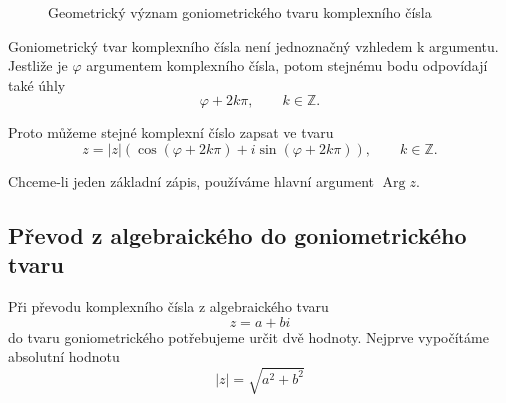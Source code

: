 \documentclass[12pt,a4paper]{article}
\begin{document}
\begin{figure}[ht]
    \begin{center}

        \caption{Geometrický význam goniometrického tvaru komplexního čísla}
    \end{center}
\end{figure}


\begin{notebox}
    Goniometrický tvar komplexního čísla není jednoznačný vzhledem k argumentu.
    Jestliže je $\varphi$ argumentem komplexního čísla, 
    potom stejnému bodu odpovídají také úhly
    \[
        \varphi+2k \pi , \qquad k \in \mathbb{Z}.
    \]

    Proto můžeme stejné komplexní číslo zapsat ve tvaru
    \[
        z = |z| \left( \cos(\varphi+2k\pi) + i\sin(\varphi+2k\pi) \right),
        \qquad k \in \mathbb{Z}.
    \]

    Chceme-li jeden základní zápis, používáme hlavní argument $\operatorname{Arg}z$.
\end{notebox}


\subsection{Převod z algebraického do goniometrického tvaru}
Při převodu komplexního čísla z algebraického tvaru
\[
    z=a+bi
\]
do tvaru goniometrického potřebujeme určit dvě hodnoty. 
Nejprve vypočítáme absolutní hodnotu
\[
    |z|=\sqrt{a^2+b^2}
\]
\end{document}
